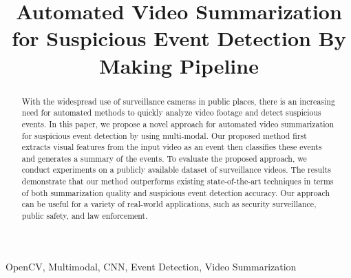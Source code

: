 \documentclass[conference]{IEEEtran}
\begin{document}
\title{Automated Video Summarization for Suspicious Event Detection By Making Pipeline\\}


\author{
\and
{}
\and
{}
}



\maketitle

\begin{abstract}
With the widespread use of surveillance cameras in public places, there is an increasing need for automated methods to quickly analyze video footage and detect suspicious events. In this paper, we propose a novel approach for automated video summarization for suspicious event detection by using multi-modal. Our proposed method first extracts visual features from the input video as an event then classifies these events and generates a summary of the events. To evaluate the proposed approach, we conduct experiments on a publicly available dataset of surveillance videos. The results demonstrate that our method outperforms existing state-of-the-art techniques in terms of both summarization quality and suspicious event detection accuracy. Our approach can be useful for a variety of real-world applications, such as security surveillance, public safety, and law enforcement.

\end{abstract}

\begin{IEEEkeywords}
OpenCV, Multimodal, CNN, Event Detection, Video Summarization
\end{IEEEkeywords}
\end{document}
